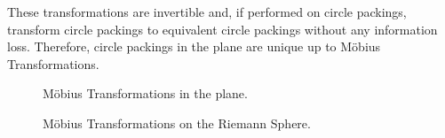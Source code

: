 \documentclass[11pt]{article}
\theoremstyle{definition}
\begin{document}
	These transformations are invertible and, if performed on circle packings, transform circle packings to equivalent circle packings without any information loss. 
	Therefore, circle packings in the plane are unique up to M\"{o}bius Transformations. 
   
    \begin{figure}[h]%
		\centering
		\qquad
		\caption{M\"{o}bius Transformations in the plane.}%
		\label{fig:mobiusplane}%
	\end{figure}

	\begin{figure}[H]%
		\centering
		\qquad
		\caption[]{M\"{o}bius Transformations on the Riemann Sphere.}%
		\label{fig:mobiussphere}%
	\end{figure}
\end{document}
